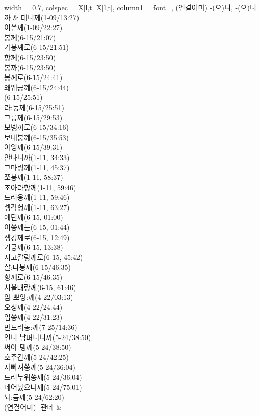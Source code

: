\begin{longtblr}{
    width = 0.7\textwidth,
    colspec = {X[l,t] X[l,t]},
    column{1} = {font=\sffamily\bfseries},
  }
  (연결어미) -(으)니, -(으)니까 & {데니께(1-09/13:27) \\ 이쓴께(1-09/22:27) \\ 봉께(6-15/21:07) \\ 가봉꼐로(6-15/21:51) \\ 항께(6-15/23:50) \\ 봉까(6-15/23:50) \\ 봉꼐로(6-15/24:41) \\ 왜웨긍꼐(6-15/24:44) \\ (6-15/25:51) \\ 라:둥께(6-15/25:51) \\ 그릉께(6-15/29:53) \\ 보넹끼로(6-15/34:16) \\ 보네붕꼐(6-15/35:53) \\ 아잉께(6-15/39:31) \\ 안나니까(1-11, 34:33) \\ 그마링께(1-11, 45:37) \\ 쪼븡께(1-11, 58:37) \\ 조아라항께(1-11, 59:46) \\ 드러옹께(1-11, 59:46) \\ 셍각헝께(1-11, 63:27) \\ 에딘께(6-15, 01:00) \\ 이씅께는(6-15, 01:44) \\ 셍깅께로(6-15, 12:49) \\ 거긍께(6-15, 13:38) \\ 지고갈랑께로(6-15, 45:42) \\ 살:다봉께(6-15/46:35) \\ 항께로(6-15/46:35) \\ 서울대랑께(6-15, 61:46) \\ 암 뽀잉:께(4-22/03:13) \\ 오싱께(4-22/24:44) \\ 업씅께(4-22/31:23) \\ 만드러농:께(7-25/14:36) \\ 언니 남펴니니까(5-24/38:50) \\ 써야 뎅께(5-24/38:50) \\ 호주간께(5-24/42:25) \\ 자빠져씅께(5-24/36:04) \\ 드러누워씅께(5-24/36:04) \\ 테어났으니께(5-24/75:01) \\ 놔:둠께(5-24/62:20)} \\
  (연결어미) -관데 & {} \\

\end{longtblr}
